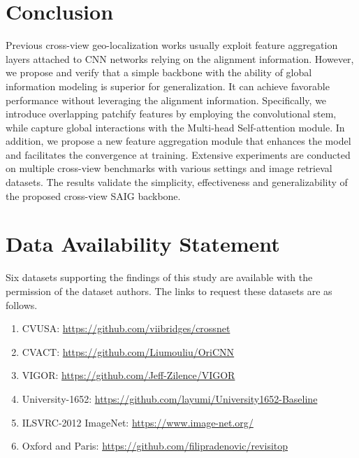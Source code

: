 \documentclass[sn-basic,iicol]{sn-jnl}
\theoremstyle{thmstyletwo}\newtheorem{example}{Example}\newtheorem{remark}{Remark}
\theoremstyle{thmstylethree}\newtheorem{definition}{Definition}
\begin{document}
\section{Conclusion}
Previous cross-view geo-localization works usually exploit feature aggregation layers attached to CNN networks relying on the alignment information. However, we propose and verify that a simple backbone with the ability of global information modeling is superior for generalization. It can achieve favorable performance without leveraging the alignment information. Specifically, we introduce overlapping patchify features by employing the convolutional stem, while capture global interactions with the Multi-head Self-attention module. In addition, we propose a new feature aggregation module that enhances the model and facilitates the convergence at training. Extensive experiments are conducted on multiple cross-view benchmarks with various settings and image retrieval datasets. The results validate the simplicity, effectiveness and generalizability of the proposed cross-view SAIG backbone.




\section*{Data Availability Statement}
Six datasets supporting the findings of this study are available with the permission of the dataset authors. The links to request these datasets are as follows.
\begin{enumerate}[(1)]
\item CVUSA: \href{https://github.com/viibridges/crossnet}{https://github.com/viibridges/crossnet}
\item CVACT: \href{https://github.com/Liumouliu/OriCNN}{https://github.com/Liumouliu/OriCNN}
\item VIGOR: \href{https://github.com/Jeff-Zilence/VIGOR}{https://github.com/Jeff-Zilence/VIGOR}
\item University-1652: \href{https://github.com/layumi/University1652-Baseline}{https://github.com/layumi/University1652-Baseline}
\item ILSVRC-2012 ImageNet: \href{https://www.image-net.org/}{https://www.image-net.org/}
\item Oxford and Paris: \href{https://github.com/filipradenovic/revisitop}{https://github.com/filipradenovic/revisitop}
\end{enumerate}






\end{document}
